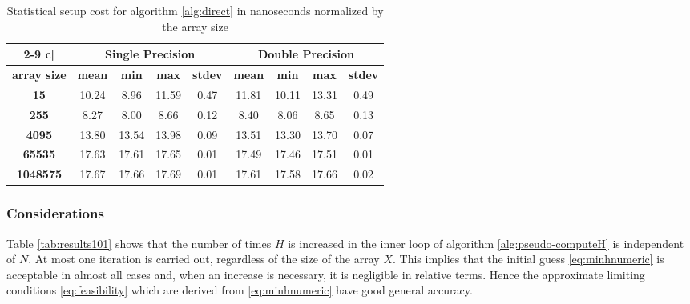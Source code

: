 \documentclass[preprint,1p,times]{elsarticle}
\begin{document}
\begin{table}[ht]
	\centering
	\footnotesize
	\begin{tabular}{| c | c c c c | c c c c |}
		\cline{2-9}
		\multicolumn{1} {c|}{}  & \multicolumn{4}{c|}{\textbf{Single Precision}}  & \multicolumn{4}{c|}{\textbf{Double Precision}} \\
		\hline
		\textbf{array size} & \textbf{mean} & \textbf{min} & \textbf{max} & \textbf{stdev} & \textbf{mean} & \textbf{min} & \textbf{max} & \textbf{stdev} \\
		\hline
		\multicolumn{1}{|c|}{\textbf{15}                                    } &      10.24 &       8.96 &      11.59 &       0.47 &      11.81 &      10.11 &      13.31 &       0.49 \\
		\multicolumn{1}{|c|}{\textbf{255}                                   } &       8.27 &       8.00 &       8.66 &       0.12 &       8.40 &       8.06 &       8.65 &       0.13 \\
		\multicolumn{1}{|c|}{\textbf{4095}                                  } &      13.80 &      13.54 &      13.98 &       0.09 &      13.51 &      13.30 &      13.70 &       0.07 \\
		\multicolumn{1}{|c|}{\textbf{65535}                                 } &      17.63 &      17.61 &      17.65 &       0.01 &      17.49 &      17.46 &      17.51 &       0.01 \\
		\multicolumn{1}{|c|}{\textbf{1048575}                               } &      17.67 &      17.66 &      17.69 &       0.01 &      17.61 &      17.58 &      17.66 &       0.02 \\
		\hline
	\end{tabular}
	\caption{Statistical setup cost for algorithm \ref{alg:direct} in nanoseconds normalized by the array size}
	\label{tab:results100}
\end{table}

\subsubsection{Considerations}
Table \ref{tab:results101} shows that the number of times $H$ is increased in the inner loop of algorithm \ref{alg:pseudo-computeH} is independent of $N$. At most one iteration is carried out, regardless of the size of the array $X$. This implies that the initial guess \eqref{eq:minhnumeric} is acceptable in almost all cases and, when an increase is necessary, it is negligible in relative terms. Hence the approximate limiting conditions \eqref{eq:feasibility} which are derived from \eqref{eq:minhnumeric} have good general accuracy.
\end{document}
